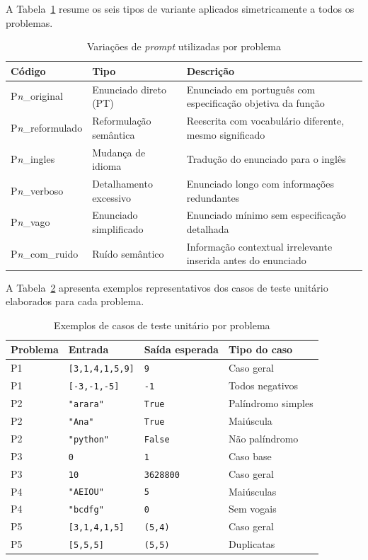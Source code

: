 \documentclass[12pt,
    english,
    french,
    spanish,
    brazil,
    ]{article}
\begin{document}
A Tabela~\ref{tab:prompts} resume os seis tipos de variante aplicados
simetricamente a todos os problemas.

\begin{table}[H]
\centering
\caption{Variações de \textit{prompt} utilizadas por problema}
\label{tab:prompts}
\begin{tabularx}{\textwidth}{llX}
\toprule
\textbf{Código} & \textbf{Tipo} & \textbf{Descrição} \\
\midrule
P\textit{n}\_original    & Enunciado direto (PT)
    & Enunciado em português com especificação objetiva da função \\
P\textit{n}\_reformulado & Reformulação semântica
    & Reescrita com vocabulário diferente, mesmo significado \\
P\textit{n}\_ingles      & Mudança de idioma
    & Tradução do enunciado para o inglês \\
P\textit{n}\_verboso     & Detalhamento excessivo
    & Enunciado longo com informações redundantes \\
P\textit{n}\_vago        & Enunciado simplificado
    & Enunciado mínimo sem especificação detalhada \\
P\textit{n}\_com\_ruido  & Ruído semântico
    & Informação contextual irrelevante inserida antes do enunciado \\
\bottomrule
\end{tabularx}
\end{table}

A Tabela~\ref{tab:testes} apresenta exemplos representativos dos casos
de teste unitário elaborados para cada problema.

\begin{table}[H]
\centering
\caption{Exemplos de casos de teste unitário por problema}
\label{tab:testes}
\begin{tabular}{llll}
\toprule
\textbf{Problema} & \textbf{Entrada} & \textbf{Saída esperada}
    & \textbf{Tipo do caso} \\
\midrule
P1 & \texttt{[3,1,4,1,5,9]} & \texttt{9}       & Caso geral \\
P1 & \texttt{[-3,-1,-5]}    & \texttt{-1}      & Todos negativos \\
P2 & \texttt{"arara"}       & \texttt{True}    & Palíndromo simples \\
P2 & \texttt{"Ana"}         & \texttt{True}    & Maiúscula \\
P2 & \texttt{"python"}      & \texttt{False}   & Não palíndromo \\
P3 & \texttt{0}             & \texttt{1}       & Caso base \\
P3 & \texttt{10}            & \texttt{3628800} & Caso geral \\
P4 & \texttt{"AEIOU"}       & \texttt{5}       & Maiúsculas \\
P4 & \texttt{"bcdfg"}       & \texttt{0}       & Sem vogais \\
P5 & \texttt{[3,1,4,1,5]}  & \texttt{(5,4)}   & Caso geral \\
P5 & \texttt{[5,5,5]}       & \texttt{(5,5)}   & Duplicatas \\
\bottomrule
\end{tabular}
\end{table}
\end{document}

